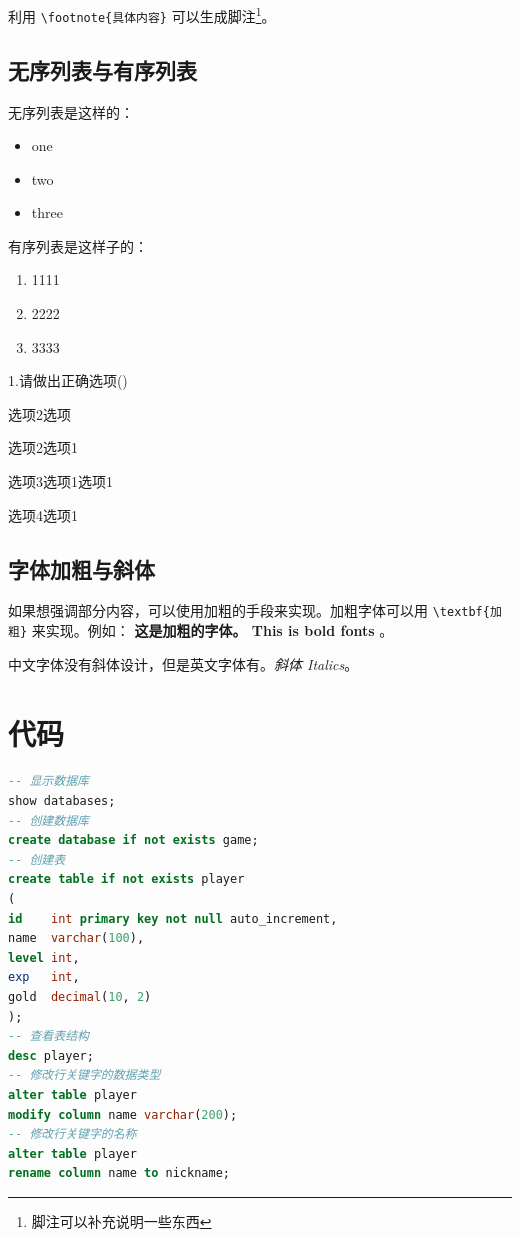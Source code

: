 利用 \verb|\footnote{具体内容}| 可以生成脚注\footnote{脚注可以补充说明一些东西}。

\subsection{无序列表与有序列表}

无序列表是这样的：
\begin{itemize}
	\item one
	\item two
	\item three
\end{itemize}

有序列表是这样子的：
\begin{enumerate}
	\item[(1)] 1111
	\item[(2)] 2222
	\item[(3)] 3333
\end{enumerate}


1.请做出正确选项(\quad )
\begin{choices}
	\item 选项2选项
	\item 选项2选项1
	\item 选项3选项1选项1
	\item 选项4选项1
\end{choices}

\subsection{字体加粗与斜体}

如果想强调部分内容，可以使用加粗的手段来实现。加粗字体可以用 \verb|\textbf{加粗}| 来实现。例如： \textbf{这是加粗的字体。 This is bold fonts} 。

中文字体没有斜体设计，但是\cite{testcite3}英文字体有。\textit{斜体 Italics}。

\newpage

\section{代码}

\begin{lstlisting}[language=sql,caption={MySql代码}]
-- 显示数据库
show databases;
-- 创建数据库
create database if not exists game;
-- 创建表
create table if not exists player
(
id    int primary key not null auto_increment,
name  varchar(100),
level int,
exp   int,
gold  decimal(10, 2)
);
-- 查看表结构
desc player;
-- 修改行关键字的数据类型
alter table player
modify column name varchar(200);
-- 修改行关键字的名称
alter table player
rename column name to nickname;
\end{lstlisting}

